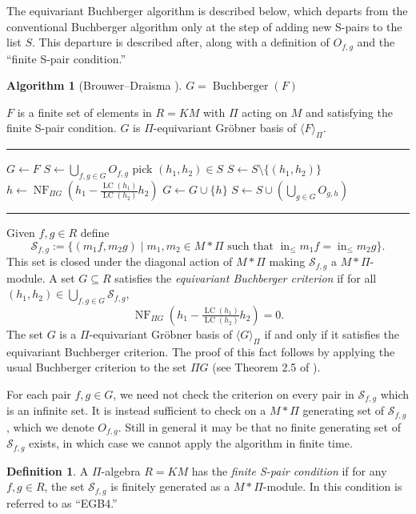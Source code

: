 \documentclass{article}
\theoremstyle{plain}
\theoremstyle{definition}
\newtheorem{definition}[theorem]{Definition}
\newtheorem{algorithm}[theorem]{Algorithm}
\numberwithin{equation}{section}
\newcommand{\C}[1]{\mathcal #1}
\newcommand{\alg}[1]{\operatorname{#1}}
\newcommand{\ideal}[1]{\langle #1 \rangle}
\DeclareMathOperator{\initial}{in}
\DeclareMathOperator{\NF}{NF}
\newcommand{\mon}{M}
\newcommand{\LT}{\initial_{\leq}}
\newcommand{\LC}{\operatorname{LC}}
\begin{document}
The equivariant Buchberger algorithm is described below, which departs from the conventional Buchberger algorithm only at the step of adding new S-pairs to the list $S$.  This departure is described after, along with a definition of $O_{f,g}$ and the ``finite S-pair condition.''

\begin{algorithm}[Brouwer--Draisma \cite{Brouwer09e}]\label{alg:Buchberger}
$G = \alg{Buchberger}(F)$
\begin{algorithmic}[1]
\REQUIRE $F$ is a finite set of elements in $R = K\mon$ with $\Pi$ acting on $\mon$ and satisfying the finite S-pair condition.
\ENSURE $G$ is $\Pi$-equivariant Gr\"obner basis of $\ideal{F}_{\Pi}$.

\smallskip \hrule \smallskip

\STATE $G\gets F$
\STATE $S\gets \bigcup_{f,g\in G} O_{f,g}$
	\STATE pick $(h_1,h_2) \in S$
	\STATE $S\gets S\setminus\{(h_1,h_2)\}$ 
	\STATE $h \gets \NF_{\Pi G}(h_1 - \frac{\LC(h_1)}{\LC(h_2)}h_2)$
		\STATE $G\gets G\cup \{h\}$
		\STATE $S\gets S\cup \left(\bigcup_{g\in G}O_{g,h}\right)$
	\ENDIF
\ENDWHILE
\smallskip \hrule \smallskip
\end{algorithmic}
\end{algorithm}

Given $f,g \in R$ define
 \[ \C S_{f,g} := \{(m_1f,m_2g) \mid m_1,m_2 \in \mon * \Pi \text{ such that } \LT m_1f = \LT m_2g\}. \]
This set is closed under the diagonal action of $\mon *\Pi$ making $\C S_{f,g}$ a $\mon *\Pi$-module.  A set $G \subseteq R$ satisfies the {\em equivariant Buchberger criterion} if for all $(h_1,h_2) \in \bigcup_{f,g\in G} \C S_{f,g}$,
 \[ \NF_{\Pi G}(h_1 - \tfrac{\LC(h_1)}{\LC(h_2)}h_2) = 0. \]
The set $G$ is a $\Pi$-equivariant Gr\"obner basis of $\ideal{G}_{\Pi}$ if and only if it satisfies the equivariant Buchberger criterion.  The proof of this fact follows by applying the usual Buchberger criterion to the set $\Pi G$ (see Theorem 2.5 of \cite{Brouwer09e}).

For each pair $f,g \in G$, we need not check the criterion on every pair in $\C S_{f,g}$ which is an infinite set.  It is instead sufficient to check on a $\mon * \Pi$ generating set of $\C S_{f,g}$, which we denote $O_{f,g}$.  Still in general it may be that no finite generating set of $\C S_{f,g}$ exists, in which case we cannot apply the algorithm in finite time.

\begin{definition}
 A $\Pi$-algebra $R = K\mon$ has the {\em finite S-pair condition} if for any $f,g \in R$, the set $\C S_{f,g}$ is finitely generated as a $\mon * \Pi$-module.  In \cite{Brouwer09e} this condition is referred to as ``EGB4.''
\end{definition}
\end{document}
